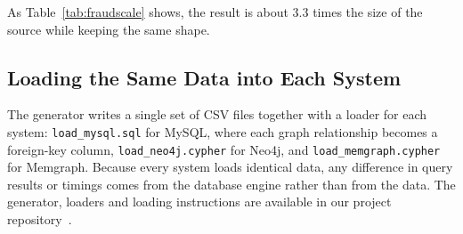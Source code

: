 As Table~\ref{tab:fraudscale} shows, the result is about 3.3 times the size of the source while keeping the same shape.

\subsection{Loading the Same Data into Each System}

The generator writes a single set of CSV files together with a loader for each system: \texttt{load\_mysql.sql} for MySQL, where each graph relationship becomes a foreign-key column, \texttt{load\_neo4j.cypher} for Neo4j, and \texttt{load\_memgraph.cypher} for Memgraph. Because every system loads identical data, any difference in query results or timings comes from the database engine rather than from the data. The generator, loaders and loading instructions are available in our project repository~\cite{team6_2026repo}.
